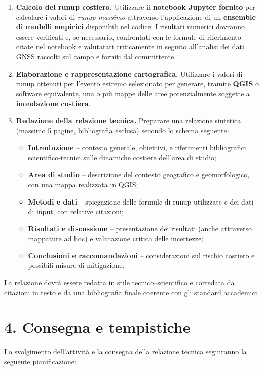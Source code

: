 \documentclass[11pt,a4paper,roman]{moderncv}
\begin{document}
\begin{enumerate}
  \item \textbf{Calcolo del runup costiero.}  
  Utilizzare il \textbf{notebook Jupyter fornito} per calcolare i valori di \textit{runup massimo} attraverso l’applicazione di un \textbf{ensemble di modelli empirici} disponibili nel codice.  
  I risultati numerici dovranno essere verificati e, se necessario, confrontati con le formule di riferimento citate nel notebook e valutatati criticamente in seguito all'analisi dei dati GNSS raccolti sul campo e forniti dal committente.
  \item \textbf{Elaborazione e rappresentazione cartografica.}  
  Utilizzare i valori di runup ottenuti per l'evento estremo selezionato per generare, tramite \textbf{QGIS} o software equivalente, una o più mappe delle aree potenzialmente soggette a \textbf{inondazione costiera}.  

  \item \textbf{Redazione della relazione tecnica.}  
  Preparare una relazione sintetica (massimo 5 pagine, bibliografia esclusa) secondo lo schema seguente:
  \begin{itemize}
    \item \textbf{Introduzione} – contesto generale, obiettivi, e riferimenti bibliografici scientifico-tecnici sulle dinamiche costiere dell’area di studio;
    \item \textbf{Area di studio} – descrizione del contesto geografico e geomorfologico, con una mappa realizzata in QGIS;
    \item \textbf{Metodi e dati} – spiegazione delle formule di runup utilizzate e dei dati di input, con relative citazioni; 
    \item \textbf{Risultati e discussione} – presentazione dei risultati (anche attraverso mappature ad hoc) e valutazione critica delle incertezze;
    \item \textbf{Conclusioni e raccomandazioni} – considerazioni sul rischio costiero e possibili misure di mitigazione.
  \end{itemize}
\end{enumerate}

  La relazione dovrà essere redatta in stile tecnico–scientifico e corredata da citazioni in testo e da una bibliografia finale coerente con gli standard accademici.

\clearpage

\section*{4. Consegna e tempistiche}
Lo svolgimento dell’attività e la consegna della relazione tecnica seguiranno la seguente pianificazione:
\end{document}
